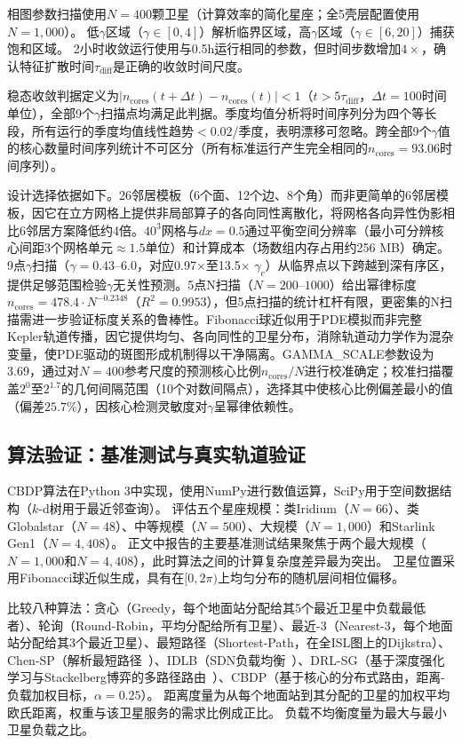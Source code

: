 \documentclass[sn-nature,pdflatex]{sn-jnl}
\begin{document}
相图参数扫描使用$N = 400$颗卫星（计算效率的简化星座；全5壳层配置使用$N = 1,000$）。
低$\gamma$区域（$\gamma \in [0, 4]$）解析临界区域，高$\gamma$区域（$\gamma \in [6, 20]$）捕获饱和区域。
2小时收敛运行使用与0.5h运行相同的参数，但时间步数增加$4\times$，确认特征扩散时间$\tau_{\text{diff}}$是正确的收敛时间尺度。

稳态收敛判据定义为$|n_{\text{cores}}(t + \Delta t) - n_{\text{cores}}(t)| < 1$（$t > 5\tau_{\text{diff}}$，$\Delta t = 100$时间单位），全部9个$\gamma$扫描点均满足此判据。季度均值分析将时间序列分为四个等长段，所有运行的季度均值线性趋势$<0.02$/季度，表明漂移可忽略。跨全部9个$\gamma$值的核心数量时间序列统计不可区分（所有标准运行产生完全相同的$n_{\text{cores}} = 93.06$时间序列）。

设计选择依据如下。26邻居模板（6个面、12个边、8个角）而非更简单的6邻居模板，因它在立方网格上提供非局部算子的各向同性离散化，将网格各向异性伪影相比6邻居方案降低约4倍。$40^3$网格与$dx=0.5$通过平衡空间分辨率（最小可分辨核心间距3个网格单元$\approx 1.5$单位）和计算成本（场数组内存占用约256 MB）确定。9点$\gamma$扫描（$\gamma = 0.43$--$6.0$，对应0.97$\times$至13.5$\times$ $\gamma_c$）从临界点以下跨越到深有序区，提供足够范围检验$\gamma$无关性预测。5点N扫描（$N=200$--$1000$）给出幂律标度$n_{\text{cores}} = 478.4 \cdot N^{-0.2348}$（$R^2=0.9953$），但5点扫描的统计杠杆有限，更密集的N扫描需进一步验证标度关系的鲁棒性。Fibonacci球近似用于PDE模拟而非完整Kepler轨道传播，因它提供均匀、各向同性的卫星分布，消除轨道动力学作为混杂变量，使PDE驱动的斑图形成机制得以干净隔离。GAMMA\_SCALE参数设为3.69，通过对$N=400$参考尺度的预测核心比例$n_{\text{cores}}/N$进行校准确定；校准扫描覆盖$2^0$至$2^{1.7}$的几何间隔范围（10个对数间隔点），选择其中使核心比例偏差最小的值（偏差$25.7\%$），因核心检测灵敏度对$\gamma$呈幂律依赖性。

\subsection{算法验证：基准测试与真实轨道验证}

CBDP算法在Python 3中实现，使用NumPy进行数值运算，SciPy用于空间数据结构（$k$-d树用于最近邻查询）。
评估五个星座规模：类Iridium（$N = 66$）、类Globalstar（$N = 48$）、中等规模（$N = 500$）、大规模（$N = 1,000$）和Starlink Gen1（$N = 4,408$）。
正文中报告的主要基准测试结果聚焦于两个最大规模（$N=1,000$和$N=4,408$），此时算法之间的计算复杂度差异最为突出。
卫星位置采用Fibonacci球近似生成，具有在$[0, 2\pi)$上均匀分布的随机层间相位偏移。

比较八种算法：贪心（Greedy，每个地面站分配给其5个最近卫星中负载最低者）、轮询（Round-Robin，平均分配给所有卫星）、最近-3（Nearest-3，每个地面站分配给其3个最近卫星）、最短路径（Shortest-Path，在全ISL图上的Dijkstra）、Chen-SP（解析最短路径~\cite{chen_2024_jsac}）、IDLB（SDN负载均衡~\cite{roth_2025_idlb}）、DRL-SG（基于深度强化学习与Stackelberg博弈的多路径路由~\cite{li_2025_tmc}）、CBDP（基于核心的分布式路由，距离-负载加权目标，$\alpha = 0.25$）。
距离度量为从每个地面站到其分配的卫星的加权平均欧氏距离，权重与该卫星服务的需求比例成正比。
负载不均衡度量为最大与最小卫星负载之比。
\end{document}

